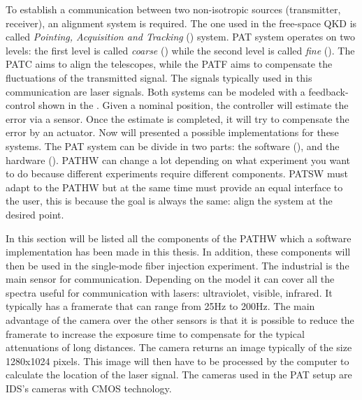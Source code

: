 To establish a communication between two non-isotropic sources (transmitter, receiver), an alignment system is required. The one used in the free-space QKD is called \textit{Pointing, Acquisition and Tracking} () system. PAT system operates on two levels: the first level is called \textit{coarse} () while the second level is called \textit{fine} ().
The PATC aims to align the telescopes, while the PATF aims to compensate the fluctuations of the transmitted signal. The signals typically used in this communication are laser signals. Both systems can be modeled with a feedback-control shown in the .
Given a nominal position, the controller will estimate the error via a sensor. Once the estimate is completed, it will try to compensate the error by an actuator.
Now will presented a possible implementations for these systems.
The PAT system can be divide in two parts: the software (), and the hardware ().
PATHW can change a lot depending on what experiment you want to do because different experiments require different components. PATSW must adapt to the PATHW but at the same time must provide an equal interface to the user, this is because the goal is always the same: align the system at the desired point.

In this section will be listed all the components of the PATHW which a software implementation has been made in this thesis. In addition, these components will then be used in the single-mode fiber injection experiment.
The industrial  is the main sensor for communication. Depending on the model it can cover all the spectra useful for communication with lasers: ultraviolet, visible, infrared.
It typically has a framerate that can range from 25Hz to 200Hz. The main advantage of the camera over the other sensors is that it is possible to reduce the framerate to increase the exposure time to compensate for the typical attenuations of long distances.
The camera returns an image typically of the size 1280x1024 pixels. This image will then have to be processed by the computer to calculate the location of the laser signal.
The cameras used in the PAT setup are IDS's cameras with CMOS technology.


